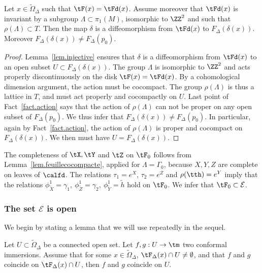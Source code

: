 \begin{lemm}\label{lem.feuillecocompacte}
Let $x \in \tilde{\Omega}_{\Delta}$ such that $\tF(x)=\tFd(x)$. Assume moreover that $\tFd(x)$ is invariant by a subgroup $\Lambda \subset \pi_1(M)$, isomorphic to $\ZZ^2$ and such that $\rho(\Lambda) \subset T$. Then the map $\delta$ is a diffeomorphism from $\tFd(x)$ to $F_{\Delta}(\delta(x))$. Moreover $F_{\Delta}(\delta(x)) \not =F_{\Delta}(p_0)$.
\end{lemm}

\begin{proof}
Lemma~\ref{lem.injective} ensures that $\delta$ is a diffeomorphism from $\tFd(x)$ to an open subset $U \subset F_{\Delta}(\delta(x))$. The group $\Lambda$ is isomorphic to $\ZZ^2$ and acts properly discontinuously on the disk $\tF(x)=\tFd(x)$. By a cohomological dimension argument, the action must be cocompact. The group $\rho(\Lambda)$ is thus a lattice in $T$, and must act properly and cocompactly on $U$. Last point of Fact~\ref{fact.action} says that the action of $\rho(\Lambda)$ can not be proper on any open subset of $F_{\Delta}(p_0)$. We thus infer that $F_{\Delta}(\delta(x)) \not = F_{\Delta}(p_0)$. In particular, again by Fact~\ref{fact.action}, the action of $\rho(\Lambda)$ is proper and cocompact on $F_{\Delta}(\delta(x))$. We then must have $U=F_{\Delta}(\delta(x))$.
\end{proof}


The completeness of $\tX,\tY$ and $\tZ$ on $\tF_0$ follows from Lemma~\ref{lem.feuillecocompacte}, applied for $\Lambda=\Gamma_0$, because $X,Y,Z$ are complete on leaves of $\calfd$. The relations $\tau_1=e^X$, $\tau_2=e^Z$ and $\rho(\tth)=e^Y$ imply that the relations $\phi_{\tilde{X}}^1=\gamma_1,
\ \phi_{\tilde{Z}}^1=\gamma_2, \ \phi_{\tilde{Y}}^1=\tilde{h}$ hold on $\tF_0$. We infer that $\tF_0 \subset {\mathcal E}$.

\subsubsection{The set \texorpdfstring{$\mathcal{E}$}{E} is open}\label{sec.open}

We begin by stating a lemma that we will use repeatedly in the sequel.

\pagebreak
\begin{lemm}\label{lem.coincide}
Let $U \subset \tilde{\Omega}_{\Delta}$ be a connected open set. Let $f,g:U \to \tm$ two conformal immersions. Assume that for some $x \in \tilde{\Omega}_{\Delta}$, $\tF_{\Delta}(x) \cap U \not = \emptyset$, and that $f$ and $g$ coincide on $\tF_{\Delta}(x) \cap U$, then $f$ and $g$ coincide on $U$.
\end{lemm}

